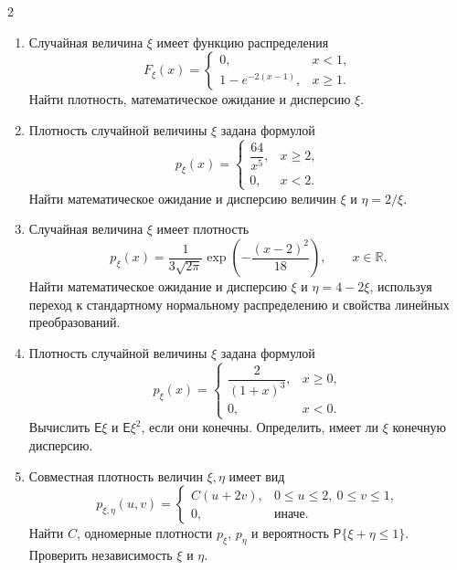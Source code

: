 \documentclass[a4paper,10pt]{article}
\newcommand{\PP}{\mathsf P}
\newcommand{\EE}{\mathsf E}
\newcommand{\R}{\mathbb R}
\begin{document}
\begin{multicols}{2}
\begin{enumerate}
\begin{minipage}[t]{\linewidth}
\end{minipage}

\item\begin{minipage}[t]{\linewidth} Случайная величина $\xi$ имеет функцию распределения
\[
F_\xi(x)=\begin{cases}0,&x<1,\\1-e^{-2(x-1)},&x\geq1.\end{cases}
\]
Найти плотность, математическое ожидание и дисперсию $\xi$.
\end{minipage}

\item\begin{minipage}[t]{\linewidth} Плотность случайной величины $\xi$ задана формулой
\[
p_\xi(x)=\begin{cases}\dfrac{64}{x^5},&x\geq2,\\[3pt]0,&x<2.\end{cases}
\]
Найти математическое ожидание и дисперсию величин $\xi$ и $\eta=2/\xi$.
\end{minipage}

\item\begin{minipage}[t]{\linewidth} Случайная величина $\xi$ имеет плотность
\[
p_\xi(x)=\frac1{3\sqrt{2\pi}}\exp\left(-\frac{(x-2)^2}{18}\right),
\qquad x\in\R.
\]
Найти математическое ожидание и дисперсию $\xi$ и $\eta=4-2\xi$, используя переход к стандартному нормальному распределению и свойства линейных преобразований.
\end{minipage}

\item\begin{minipage}[t]{\linewidth} Плотность случайной величины $\xi$ задана формулой
\[
p_\xi(x)=\begin{cases}\dfrac2{(1+x)^3},&x\geq0,\\[3pt]0,&x<0.\end{cases}
\]
Вычислить $\EE\xi$ и $\EE\xi^2$, если они конечны. Определить, имеет ли $\xi$ конечную дисперсию.
\end{minipage}


\item\begin{minipage}[t]{\linewidth} Совместная плотность величин $\xi,\eta$ имеет вид
\[
p_{\xi,\eta}(u,v)=\begin{cases}C(u+2v),&0\leq u\leq2,\ 0\leq v\leq1,\\0,&\text{иначе}.\end{cases}
\]
Найти $C$, одномерные плотности $p_\xi$, $p_\eta$ и вероятность $\PP\{\xi+\eta\leq1\}$. Проверить независимость $\xi$ и $\eta$.
\end{minipage}



\end{enumerate}
\end{multicols}
\end{document}
